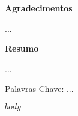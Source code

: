 \documentclass[12pt, a4paper, twoside]{article}
\numberwithin{equation}{subsection} %
\begin{document}

\vspace*{2.5cm}

\begin{center}
 {\Large \bfseries Agradecimentos}
\end{center}
\baselineskip 19.5pt 
\vspace*{1.5cm}

...

\newpage


\vspace*{2.5cm}

%
%
%
%
%  

\begin{center}
 {\Large \bfseries Resumo}
\end{center}
\baselineskip 19.5pt 
\vspace*{1.5cm}
...

\vspace*{1.5cm}
Palavras-Chave: ...

\newpage

\listoftables

\newpage

\listoffigures

\newpage


\tableofcontents

\newpage




$body$





\clearpage


\end{document}
